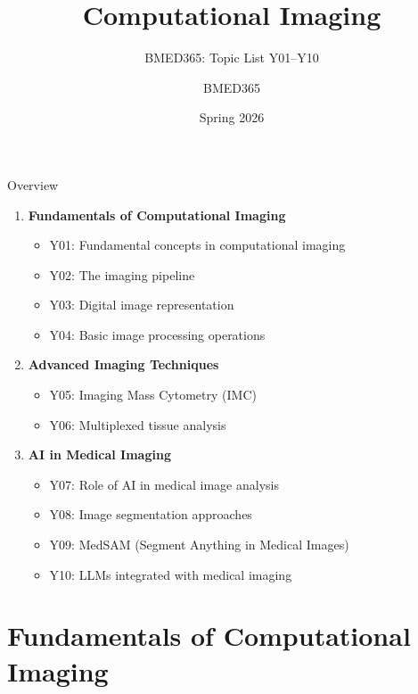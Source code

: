 \documentclass[aspectratio=169, 10pt]{beamer}
\title{Computational Imaging}
\subtitle{BMED365: Topic List Y01--Y10}
\author{BMED365}
\date{Spring 2026}
\begin{document}
\begin{frame}
    \titlepage
\end{frame}

\begin{frame}{Overview}
    \begin{enumerate}
        \item \textbf{Fundamentals of Computational Imaging}
        \begin{itemize}
            \item Y01: Fundamental concepts in computational imaging
            \item Y02: The imaging pipeline
            \item Y03: Digital image representation
            \item Y04: Basic image processing operations
        \end{itemize}
        \item \textbf{Advanced Imaging Techniques}
        \begin{itemize}
            \item Y05: Imaging Mass Cytometry (IMC)
            \item Y06: Multiplexed tissue analysis
        \end{itemize}
        \item \textbf{AI in Medical Imaging}
        \begin{itemize}
            \item Y07: Role of AI in medical image analysis
            \item Y08: Image segmentation approaches
            \item Y09: MedSAM (Segment Anything in Medical Images)
            \item Y10: LLMs integrated with medical imaging
        \end{itemize}
    \end{enumerate}
\end{frame}

\section{Fundamentals of Computational Imaging}
\end{document}
